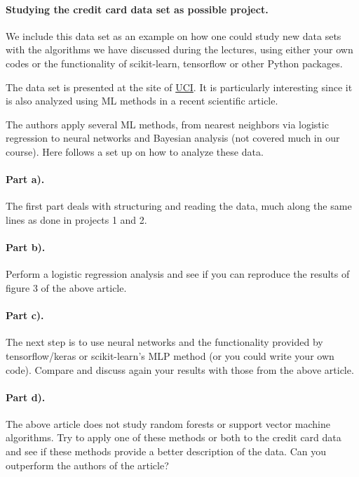 \documentclass[%
oneside,                 %
final,                   %
10pt]{article}
\begin{document}
\paragraph{Studying the credit card data set as possible project.}
We include this data set as an example on how one could study new data
sets with the algorithms we have discussed during the lectures, using
either your own codes or the functionality of scikit-learn, tensorflow
or other Python packages.

The data set is presented at the site of \href{{https://archive.ics.uci.edu/ml/index.php}}{UCI}. It is particularly
interesting since it is also analyzed using ML methods in a recent
scientific article.

The authors apply several ML methods, from nearest neighbors via
logistic regression to neural networks and Bayesian analysis (not
covered much in our course). Here follows a set up on how to analyze
these data.

\paragraph{Part a).}
The first part deals with structuring and reading the data, much along the same lines as done in projects 1 and 2.

\paragraph{Part b).}
Perform a logistic regression analysis and see if you can reproduce the results of figure 3 of the above article.

\paragraph{Part c).}
The next step is to use neural networks and the functionality provided
by tensorflow/keras or scikit-learn's MLP method (or you could write
your own code). Compare and discuss again your results with those from
the above article.

\paragraph{Part d).}
The above article does not study random forests or support vector
machine algorithms. Try to apply one of these methods or both to the
credit card data and see if these methods provide a better description
of the data. Can you outperform the authors of the article?
\end{document}
